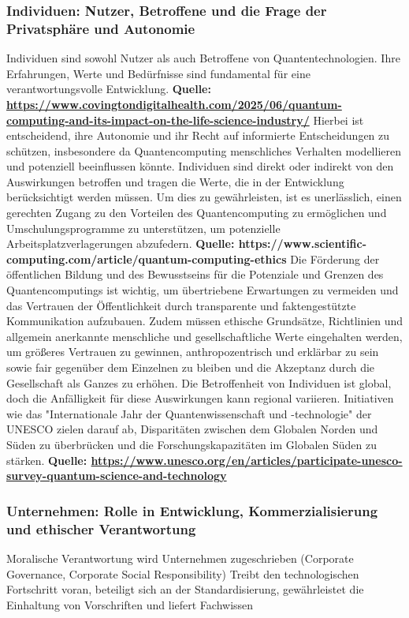 \subsubsection{Individuen: Nutzer, Betroffene und die Frage der Privatsphäre und Autonomie}
Individuen sind sowohl Nutzer als auch Betroffene von Quantentechnologien. Ihre Erfahrungen, Werte und Bedürfnisse sind fundamental für eine verantwortungsvolle Entwicklung. \textbf{Quelle: \href{https://www.covingtondigitalhealth.com/2025/06/quantum-computing-and-its-impact-on-the-life-science-industry/}{https://www.covingtondigitalhealth.com/2025/06/quantum-computing-and-its-impact-on-the-life-science-industry/}} Hierbei ist entscheidend, ihre Autonomie und ihr Recht auf informierte Entscheidungen zu schützen, insbesondere da Quantencomputing menschliches Verhalten modellieren und potenziell beeinflussen könnte. Individuen sind direkt oder indirekt von den Auswirkungen betroffen und tragen die Werte, die in der Entwicklung berücksichtigt werden müssen. Um dies zu gewährleisten, ist es unerlässlich, einen gerechten Zugang zu den Vorteilen des Quantencomputing zu ermöglichen und Umschulungsprogramme zu unterstützen, um potenzielle Arbeitsplatzverlagerungen abzufedern. \textbf{Quelle: https://www.scientific-computing.com/article/quantum-computing-ethics} Die Förderung der öffentlichen Bildung und des Bewusstseins für die Potenziale und Grenzen des Quantencomputings ist wichtig, um übertriebene Erwartungen zu vermeiden und das Vertrauen der Öffentlichkeit durch transparente und faktengestützte Kommunikation aufzubauen. Zudem müssen ethische Grundsätze, Richtlinien und allgemein anerkannte menschliche und gesellschaftliche Werte eingehalten werden, um größeres Vertrauen zu gewinnen, anthropozentrisch und erklärbar zu sein sowie fair gegenüber dem Einzelnen zu bleiben und die Akzeptanz durch die Gesellschaft als Ganzes zu erhöhen.
Die Betroffenheit von Individuen ist global, doch die Anfälligkeit für diese Auswirkungen kann regional variieren. Initiativen wie das "Internationale Jahr der Quantenwissenschaft und -technologie" der UNESCO zielen darauf ab, Disparitäten zwischen dem Globalen Norden und Süden zu überbrücken und die Forschungskapazitäten im Globalen Süden zu stärken. \textbf{Quelle: \href{https://www.unesco.org/en/articles/participate-unesco-survey-quantum-science-and-technology}{https://www.unesco.org/en/articles/participate-unesco-survey-quantum-science-and-technology}}

\subsubsection{Unternehmen: Rolle in Entwicklung, Kommerzialisierung und ethischer Verantwortung}
Moralische Verantwortung wird Unternehmen zugeschrieben (Corporate Governance, Corporate Social Responsibility)
Treibt den technologischen Fortschritt voran, beteiligt sich an der Standardisierung, gewährleistet die Einhaltung von Vorschriften und liefert Fachwissen

